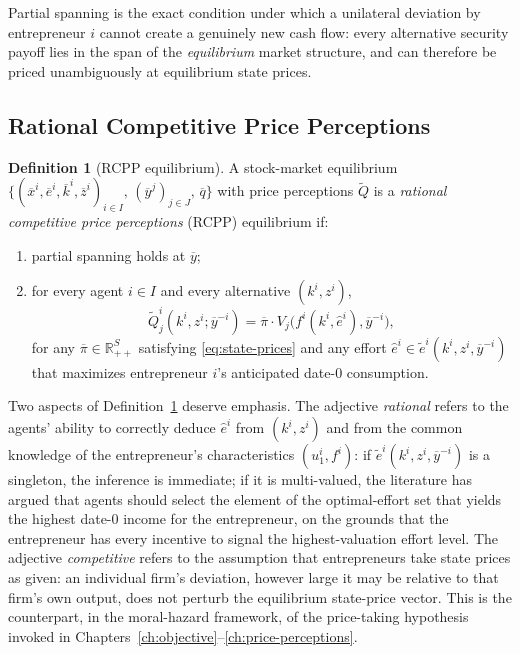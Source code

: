 \documentclass[11pt,a4paper,oneside]{book}
\def\R{\mathbb{R}}
\theoremstyle{plain}
\theoremstyle{definition}
\newtheorem{definition}[theorem]{Definition}
\theoremstyle{remark}
\numberwithin{equation}{chapter}
\begin{document}
Partial spanning is the exact condition under which a unilateral deviation by entrepreneur $i$ cannot create a genuinely new cash flow: every alternative security payoff lies in the span of the \emph{equilibrium} market structure, and can therefore be priced unambiguously at equilibrium state prices.

\subsection{Rational Competitive Price Perceptions}

\begin{definition}[RCPP equilibrium]\label{def:RCPP}
A stock-market equilibrium $\bigl\{ (\overline{x}^i, \overline{e}^i, \overline{k}^i, \overline{z}^i)_{i \in I}, \, (\overline{y}^j)_{j \in J}, \, \overline{q} \bigr\}$ with price perceptions $\widetilde{Q}$ is a \emph{rational competitive price perceptions} (RCPP) equilibrium if:
\begin{enumerate}
  \item[(i)] partial spanning holds at $\overline{y}$;
  \item[(ii)] for every agent $i \in I$ and every alternative $(k^i, z^i)$,
  \begin{equation}\label{eq:RCPP-perception}
    \widetilde{Q}^i_j(k^i, z^i; \overline{y}^{-i})
    = \overline{\pi} \cdot V_j\bigl( f^i(k^i, \widehat{e}^i), \overline{y}^{-i} \bigr),
  \end{equation}
  for any $\overline{\pi} \in \R_{++}^S$ satisfying \eqref{eq:state-prices} and any effort $\widehat{e}^i \in \widetilde{e}^i(k^i, z^i, \overline{y}^{-i})$ that maximizes entrepreneur $i$'s anticipated date-$0$ consumption.
\end{enumerate}
\end{definition}

Two aspects of Definition~\ref{def:RCPP} deserve emphasis.
The adjective \emph{rational} refers to the agents' ability to correctly deduce $\widehat{e}^i$ from $(k^i, z^i)$ and from the common knowledge of the entrepreneur's characteristics $(u^i_1, f^i)$: if $\widetilde{e}^i(k^i, z^i, \overline{y}^{-i})$ is a singleton, the inference is immediate; if it is multi-valued, the literature has argued that agents should select the element of the optimal-effort set that yields the highest date-$0$ income for the entrepreneur, on the grounds that the entrepreneur has every incentive to signal the highest-valuation effort level.
The adjective \emph{competitive} refers to the assumption that entrepreneurs take state prices as given: an individual firm's deviation, however large it may be relative to that firm's own output, does not perturb the equilibrium state-price vector.
This is the counterpart, in the moral-hazard framework, of the price-taking hypothesis invoked in Chapters~\ref{ch:objective}--\ref{ch:price-perceptions}.
\end{document}
